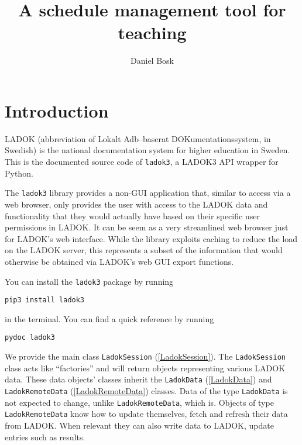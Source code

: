 \documentclass[a4paper,oneside]{book}
\title{%
  A schedule management tool for teaching
}
\author{%
  Daniel Bosk
}
\affil{%
  KTH EECS\\
  \texttt{dbosk@kth.se}
}
\newenvironment{abstract}{}{}
\begin{document}
\frontmatter
\maketitle

\vspace*{\fill}
\clearpage

\begin{abstract}
  
\end{abstract}
\clearpage

\tableofcontents
\clearpage

\mainmatter
\chapter{Introduction}

LADOK (abbreviation of \foreignlanguage{swedish}{Lokalt Adb–baserat 
DOKumentationssystem}, in Swedish) is the national documentation system for 
higher education in Sweden.
This is the documented source code of \texttt{ladok3}, a LADOK3 API wrapper for 
Python.

The \texttt{ladok3} library provides a non-GUI application that, similar to 
access via a web browser, only provides the user with access to the LADOK data 
and functionality that they would actually have based on their specific user 
permissions in LADOK.
It can be seem as a very streamlined web browser just for LADOK's web 
interface.
While the library exploits caching to reduce the load on the LADOK server, this 
represents a subset of the information that would otherwise be obtained via
LADOK's web GUI export functions.

You can install the \texttt{ladok3} package by running
\begin{verbatim}
pip3 install ladok3
\end{verbatim}
in the terminal.
You can find a quick reference by running
\begin{verbatim}
pydoc ladok3
\end{verbatim}

We provide the main class \texttt{LadokSession} (\cref{LadokSession}).
The \texttt{LadokSession} class acts like \enquote{factories} and will return 
objects representing various LADOK data.
These data objects' classes inherit the \texttt{LadokData} (\cref{LadokData}) 
and \texttt{LadokRemoteData} (\cref{LadokRemoteData}) classes.
Data of the type \texttt{LadokData} is not expected to change, unlike 
\texttt{LadokRemoteData}, which is.
Objects of type \texttt{LadokRemoteData} know how to update themselves, \ie fetch 
and refresh their data from LADOK.
When relevant they can also write data to LADOK, \ie update entries such as 
results.
\end{document}
